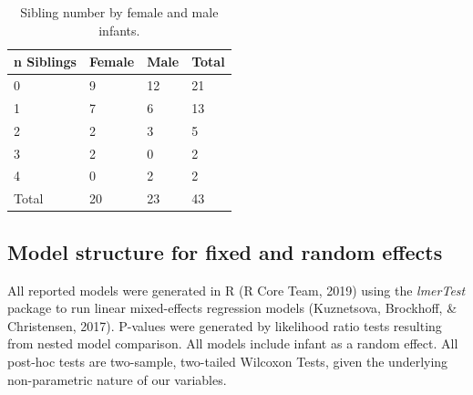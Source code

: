 \documentclass[
  english,
  man,floatsintext]{apa6}
\begin{document}
\begin{table}[H]

\begin{center}
\begin{threeparttable}

\caption{\label{tab:table-sibling-number}Sibling number by female and male infants.}

\small{

\begin{tabular}{llll}
\toprule
n Siblings & \multicolumn{1}{c}{Female} & \multicolumn{1}{c}{Male} & \multicolumn{1}{c}{Total}\\
\midrule
0 & 9 & 12 & 21\\
1 & 7 & 6 & 13\\
2 & 2 & 3 & 5\\
3 & 2 & 0 & 2\\
4 & 0 & 2 & 2\\
Total & 20 & 23 & 43\\
\bottomrule
\end{tabular}

}

\end{threeparttable}
\end{center}

\end{table}

\hypertarget{model-structure-for-fixed-and-random-effects}{%
\subsection{Model structure for fixed and random effects}\label{model-structure-for-fixed-and-random-effects}}

All reported models were generated in R (R Core Team, 2019) using the \emph{lmerTest} package to run linear mixed-effects regression models (Kuznetsova, Brockhoff, \& Christensen, 2017). P-values were generated by likelihood ratio tests resulting from nested model comparison. All models include infant as a random effect. All post-hoc tests are two-sample, two-tailed Wilcoxon Tests, given the underlying non-parametric nature of our variables.
\end{document}
